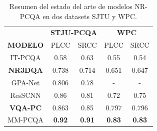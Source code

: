 \begin{frame}
\begin{columns}
      \begin{table}[htp]
          \footnotesize
          \centering
          \begin{tabular}{|c|c|c|c|c|}
              \hline
              \rowcolor[HTML]{FFC702}
              \cellcolor[HTML]{FFC702} & \multicolumn{2}{c|}{\cellcolor[HTML]{FFC702}\textbf{STJU-PCQA}} & \multicolumn{2}{c|}{\cellcolor[HTML]{FFC702}\textbf{WPC}} \\ 
              \cline{2-5}
             \multirow{-2}{*}{\cellcolor[HTML]{FFC702}\textbf{MODELO}}  &\multicolumn{1}{c|}{\cellcolor[HTML]{FFC702} PLCC} & \multicolumn{1}{c|}{\cellcolor[HTML]{FFC702}SRCC} & \multicolumn{1}{c|}{\cellcolor[HTML]{FFC702}PLCC} & \multicolumn{1}{c|}{\cellcolor[HTML]{FFC702}SRCC} \\
              \hline
              IT-PCQA & 0.58 & 0.63 & 0.55  & 0.54\\
              \hline
              \textbf<2->{NR3DQA} & 0.738 & 0.714 & 0.651 & 0.647\\
              \hline
              GPA-Net & 0.806 & 0.78 & - & - \\
              \hline
              ResSCNN & 0.86 & 0.81 & 0.72 & 0.75\\
              \hline
              \textbf<3->{VQA-PC} & 0.863 & 0.85 & 0.797 & 0.796\\
              \hline
              MM-PCQA & \textbf{0.92} & \textbf{0.91} & \textbf{0.83} & \textbf{0.83}\\
              \hline
          \end{tabular}
          \caption[Estado del arte de modelos NR-PCQA]{
          Resumen del estado del arte de modelos NR-PCQA en dos datasets SJTU y WPC.
        }
      \end{table}
  \end{columns}
\end{frame}

